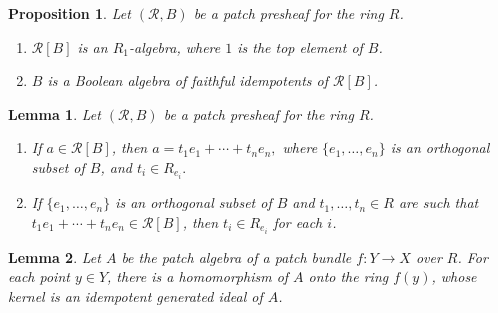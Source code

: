 \documentclass[10pt,a4paper]{amsart}
\newtheorem{lemma}{Lemma}
\newtheorem{proposition}{Proposition}
\def\cal{\mathcal}
\begin{document}
\begin{proposition} \label{prop: R presheaf}
Let $({\cal R},B)$ be a patch presheaf for the ring $R$. 

\begin{enumerate}[label=\textup{(\arabic{*})}, mode=unboxed]
\item\label{prop: R presheaf 1}
${\cal R}[B] $ is an $R_1$-algebra, where $1$ is the top element of $B$. 

\item\label{prop: R presheaf 2} $B$ is a Boolean algebra of faithful idempotents of ${\cal R}[B]$.
\end{enumerate}
\end{proposition}

\begin{lemma}\label{lem: R presheaf} Let $({\cal R}, B)$ be a patch presheaf for the ring $R$.  
\begin{enumerate}[label=\textup{(\roman{*})}, mode=unboxed]
    \item\label{lem: R presheaf i} If $a \in {\cal R}[B] $, then $a =  t_1e_1+ \cdots + t_ne_n,$ where $\{e_1,\ldots,e_n\}$ is an orthogonal subset of $B$, and $t_i \in R_{e_i}.$
    \item\label{lem: R presheaf ii} If $\{e_1,\ldots,e_n\}$ is an orthogonal subset of $B$ and $t_1,\ldots,t_n \in R$ are such that $t_1e_1+\cdots +t_ne_n  \in {\cal R}[B] $, then $t_i \in R_{e_i}$ for each $i$. 
\end{enumerate}
\end{lemma}

\begin{lemma} \label{lem: basic patch}
Let $A$ be the patch algebra of a patch bundle $f:Y \rightarrow X$ over $R$. For each point $y \in Y$, there is a homomorphism of $A$ onto the ring $f(y)$, whose kernel is an idempotent generated ideal of $A$.   
\end{lemma}
\end{document}
